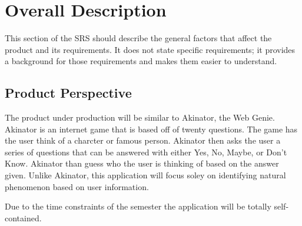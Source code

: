 \documentclass[]{article}
\begin{document}

\section{Overall Description}
\label{sec:overall_description}

This section of the SRS should describe the general factors that affect the product and its requirements. It does not state specific requirements; it provides a background for those requirements and makes them easier to understand.

\subsection{Product Perspective}
\label{sub:product_perspective}
The product under production will be similar to Akinator, the Web Genie. Akinator is an internet game that is based off of twenty questions. The game has the user think of a charcter or famous person. Akinator then asks the user a series of questions that can be answered with either Yes, No, Maybe, or Don't Know. Akinator than guess who the user is thinking of based on the answer given.  Unlike Akinator, this application will focus soley on identifying natural phenomenon based on user information.
  

Due to the time constraints of the semester the application will be totally self-contained. 
\end{document}
